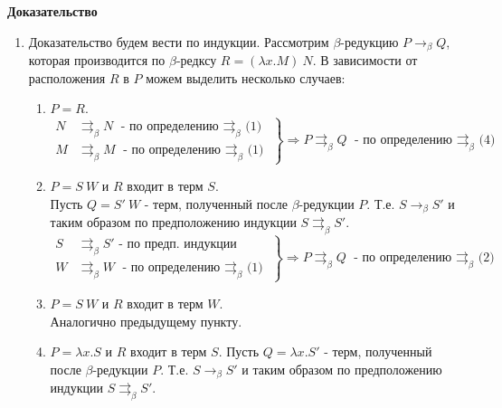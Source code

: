 \documentclass[12pt]{extreport}
\begin{document}
    \textbf{Доказательство}
    \begin{addmargin}[3em]{0}
    
        \begin{enumerate}
        \item Доказательство будем вести по индукции. Рассмотрим $\beta$-редукцию $P \rightarrow_\beta Q$, которая производится по $\beta$-редксу $R = (\lambda x.M)\ N$. В зависимости от расположения $R$ в $P$ можем выделить несколько случаев:
        \begin{enumerate}
            \item $P = R$. \\ 
                \begin{equation*}
                  \left.\begin{aligned}
                  N &\rightrightarrows_\beta N \text{ - по определению $\rightrightarrows_\beta$ (1)} \\
                  M &\rightrightarrows_\beta M \text{ - по определению $\rightrightarrows_\beta$ (1)}
                \end{aligned}\right\} \Rightarrow P \rightrightarrows_\beta Q \text{ - по определению $\rightrightarrows_\beta$ (4)}
                \end{equation*}
            \item $P = S\ W$ и $R$ входит в терм $S$. \\
                Пусть $Q = S'\ W$ - терм, полученный после $\beta$-редукции $P$. Т.е. $S \rightarrow_\beta S'$ и таким образом по предположению индукции $S \rightrightarrows_\beta S'$. 
                \begin{equation*}
                  \left.\begin{aligned}
                  S &\rightrightarrows_\beta S' \text{ - по предп. индукции} \\
                  W &\rightrightarrows_\beta W \text{ - по определению $\rightrightarrows_\beta$ (1)}
                \end{aligned}\right\} \Rightarrow P \rightrightarrows_\beta Q \text{ - по определению $\rightrightarrows_\beta$ (2)}
                \end{equation*}
            \item $P = S\ W$ и $R$ входит в терм $W$. \\ Аналогично предыдущему пункту.
            \item $P = \lambda x.S$ и $R$ входит в терм $S$.
                Пусть $Q = \lambda x. S'$ - терм, полученный после $\beta$-редукции $P$. Т.е. $S \rightarrow_\beta S'$ и таким образом по предположению индукции $S \rightrightarrows_\beta S'$. 

\end{enumerate}
\end{enumerate}
\end{addmargin}
\end{document}
